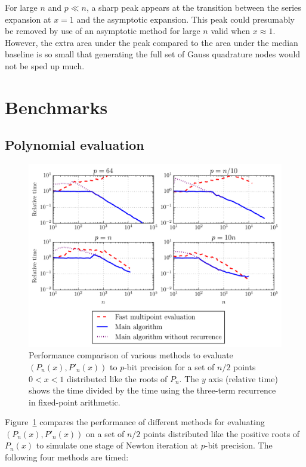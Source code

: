 \documentclass{siamart0216}
\begin{document}
For large $n$ and $p \ll n$, a sharp peak appears at the transition between the series expansion at $x = 1$ and the asymptotic expansion. This peak could presumably be removed by use of an asymptotic method for large $n$ valid when $x \approx 1$. However, the extra area under the peak compared to the area under the median baseline is so small that generating the full set of Gauss quadrature nodes would not be sped up much.

\section{Benchmarks}

\label{sec:bench}

\subsection{Polynomial evaluation}

\begin{figure}[h!]
\begin{centering}
\includegraphics[width=\textwidth]{benchplot}
\caption{Performance comparison of various methods to evaluate $(P_n(x), P'_n(x))$ to $p$-bit precision for a
set of $n / 2$ points $0 < x < 1$ distributed like the roots of $P_n$.
The $y$ axis (relative time) shows the time divided by the time
using the three-term recurrence in fixed-point arithmetic.}
\label{fig:benchplot}
\end{centering}
\end{figure}

Figure~\ref{fig:benchplot} compares the performance of different methods
for evaluating $(P_n(x), P'_n(x))$ on a set of $n/2$ points
distributed like the positive roots of $P_n(x)$
to simulate one stage of Newton iteration at $p$-bit precision.
The following four methods are timed:
\end{document}
